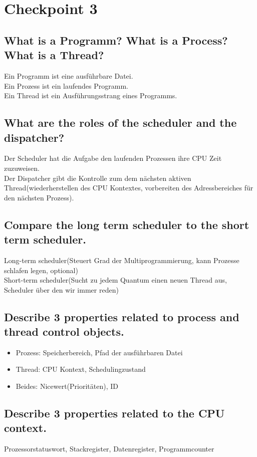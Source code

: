 \section{Checkpoint 3}

\addtocounter{subsection}{1}

\subsection{What is a Programm? What is a Process? What is a Thread?}
Ein Programm ist eine ausf\"uhrbare Datei.\\
Ein Prozess ist ein laufendes Programm.\\
Ein Thread ist ein Ausf\"uhrungsstrang eines Programms.

\subsection{What are the roles of the scheduler and the dispatcher?}
Der Scheduler hat die Aufgabe den laufenden Prozessen ihre CPU Zeit zuzuweisen.\\
Der Dispatcher gibt die Kontrolle zum dem n\"achsten aktiven Thread(wiederherstellen des CPU Kontextes, vorbereiten des Adressbereiches f\"ur den n\"achsten Prozess).

\subsection{Compare the long term scheduler to the short term scheduler.}
Long-term scheduler(Steuert Grad der Multiprogrammierung, kann Prozesse schlafen legen, optional)\\
Short-term scheduler(Sucht zu jedem Quantum einen neuen Thread aus, Scheduler \"uber den wir immer reden)

\subsection{Describe 3 properties related to process and thread control objects.}
\begin{itemize}
	\setlength\itemsep{-0.5em}
	\item Prozess: Speicherbereich, Pfad der ausf\"uhrbaren Datei
	\item Thread: CPU Kontext, Schedulingzustand
	\item Beides: Nicewert(Priorit\"aten), ID
\end{itemize}

\subsection{Describe 3 properties related to the CPU context.}
Prozessorstatuswort, Stackregister, Datenregister, Programmcounter

